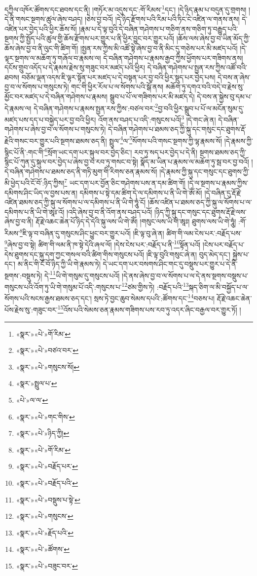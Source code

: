 དཀྱིལ་འཁོར་ཚོགས་དང་ཐབས་དང་ནི། །གཏོར་མ་འདུས་དང་:གོ་རིམས་\footnote{«སྣར་»«པེ་»གོ་རིམ་}དང་། །དེ་ཉིད་རྣམ་པ་བདུན་དུ་གྲགས། །དེ་ནི་གསང་སྔགས་ཚུལ་ཞེས་བཤད། །ཅེས་བྱ་བའོ། །དེ་ཉིད་རྫོགས་པའི་རིམ་པའི་ཏིང་ངེ་འཛིན་ལ་གནས་ནས། དེ་འཛིན་པར་བྱེད་པའི་ཕྱིར་ཆོས་སོ། །རྣམ་པ་དེ་ལྟ་བུའི་དེ་བཞིན་གཤེགས་པ་གཅིག་ནས་གཅིག་ཏུ་བརྒྱུད་པའི་སྔགས་ཀྱི་སྤྱོད་པའི་ཚུལ་གྱི་ཆོས་རྫོགས་པར་གྱུར་པ་ནི་ཕྱིར་བྱུང་བར་གྱུར་པའོ། །ཆོས་ལས་ཞེས་བྱ་བ་ཡིན་མོད་ཀྱི་ཆོས་ཞེས་བྱ་བ་ནི་ལུང་གི་ཚིག་གོ། །སྤྱན་རས་ཀྱིས་མི་འཚོ་སྟེ་ཞེས་བྱ་བ་ནི་མིང་དུ་གཅེས་པར་མི་མཛད་པའོ། །དེ་ལྟར་སྔགས་ལ་མཆོག་ཏུ་གཞོལ་བ་རྣམས་ལ། དེ་བཞིན་གཤེགས་པ་རྣམས་རྒྱབ་ཀྱིས་ཕྱོགས་པར་གཟིགས་ནས། དངོས་གྲུབ་འདོད་པ་དེ་རྣམས་རྗེས་སུ་གཟུང་བར་མཛད་པའི་ཕྱིར། དེ་བཞིན་གཤེགས་པ་སྤྱན་རས་ཀྱིས་འཚོ་བའི་ཐབས། བཅོམ་ལྡན་འདས་ཇི་ལྟར་སྟོན་པར་མཛད་པ་དེ་བསྟན་པར་བྱ་བའི་ཕྱིར་སྡུད་པར་བྱེད་པས། དེ་བས་ན་ཞེས་བྱ་བ་ལ་སོགས་པ་གསུངས་ཏེ། གང་གི་ཕྱིར་རོལ་པ་ལ་སོགས་པའི་སྒོ་ནས། མཆོག་ཏུ་དགའ་བའི་བདེ་བ་རྗེས་སུ་མྱོང་བར་མཛད་པ་དེ་བཞིན་གཤེགས་པ་རྣམས། སྒྲུབ་པ་པོ་ལ་གཟིགས་པར་མི་མཛད་དེ། དེ་བས་ན་སྐྱེས་བུ་དམ་པ་དེ་རྣམས་ལ། དེ་བཞིན་གཤེགས་པ་རྣམས་སྤྱན་རས་ཀྱིས་:བཙལ་བར་\footnote{«སྣར་»«པེ་»བཙའ་བར་}བྱ་བའི་ཕྱིར་སྒྲུབ་པ་པོ་ལ་མངོན་སུམ་དུ་མཛད་པས་དད་པ་བསྐྱེད་པར་བྱ་བའི་ཕྱིར། འོག་ནས་བཤད་པ་འདི་:གསུངས་པའོ།\footnote{«སྣར་»«པེ་»གསུངས་སོ།} །དེ་གང་ཞེ་ན། དེ་བཞིན་གཤེགས་པ་ཞེས་བྱ་བ་ལ་སོགས་པ་གསུངས་ཏེ། དེ་བཞིན་གཤེགས་པ་ཐམས་ཅད་ཀྱི་སྐུ་དང་གསུང་དང་ཐུགས་རྡོ་རྗེའི་གསང་བར་གྱུར་པའི་སྔགས་ཐམས་ཅད་ནི། སྤྲུལ་\footnote{«སྣར་»སྤྲུལ་པ་}ལ་\footnote{«པེ་»ལ་ལ་}སོགས་པའི་གསང་སྔགས་ཀྱི་ལྷ་རྣམས་སོ། །དེ་རྣམས་ཀྱི་སྙིང་པོ་ནི་:གང་གི་\footnote{«སྣར་»«པེ་»གང་གིས་}སྲོག་ཡང་དག་པར་སྐུལ་བར་བྱེད་ཅིང་། རབ་ཏུ་སད་པར་བྱེད་པ་དེ་ནི། སྔགས་ཐམས་ཅད་ཀྱི་སྙིང་པོ་ཀུན་དུ་སྐུལ་བར་བྱེད་པ་ཞེས་བྱ་བ་རབ་ཏུ་གསང་བ་སྟེ། སྣོད་མ་ཡིན་པ་རྣམས་ལ་མཆོག་ཏུ་སྦ་བར་བྱ་བའོ། །དེ་བཞིན་གཤེགས་པ་ཐམས་ཅད་ནི་གཏི་མུག་གི་རིགས་ཅན་རྣམས་སོ། །དེ་རྣམས་ཀྱི་སྐུ་དང་གསུང་དང་ཐུགས་ཀྱི་མི་ཕྱེད་པའི་ངོ་བོ་:ཉིད་ཀྱིས།\footnote{«སྣར་»«པེ་»ཉིད་ཀྱི།} ཡང་དག་པར་བྱོན་ཅིང་གཤེགས་པས་ན་དམ་ཚིག་གོ། །དེ་ལ་སྔགས་པ་རྣམས་ཀྱིས་དམིགས་ཤིང་ཡིད་ལ་བྱས་པས་ན། དམིགས་པ་སྟེ་དམ་ཚིག་དེ་ལ་དམིགས་པ་ནི་ཡི་གེ་ཨོཾ་མོ། །དེ་བཞིན་དུ་རྡོ་རྗེ་འཛིན་ཐམས་ཅད་ཀྱི་སྐུ་ལ་སོགས་པ་ལ་དམིགས་པ་ནི་ཡི་གེ་ཧཱུཾ་ངོ། །ཆོས་འཛིན་པ་ཐམས་ཅད་ཀྱི་སྐུ་ལ་སོགས་པ་ལ་དམིགས་པ་ནི་ཡི་གེ་ཨཱཿ་འོ། །འདི་ཞེས་བྱ་བ་ནི་འོག་ནས་བཤད་པའོ། །ཉིད་ཀྱི་སྐུ་དང་གསུང་དང་ཐུགས་རྡོ་རྗེ་ལས་ཞེས་བྱ་བ་ནི། རྡོ་རྗེ་འཆང་ཆེན་པོ་ཉིད་དེ་དེའི་སྐུ་ལས་ཡི་གེ་ཨོཾ། །གསུང་ལས་ཡི་གེ་ཨཱཿ། ཐུགས་ལས་ཡི་གེ་ཧཱུཾ། :གོ་རིམས་\footnote{«སྣར་»«པེ་»གོ་རིམ་}ཇི་ལྟ་བ་བཞིན་དུ་གསུངས་ཤིང་ཕྱུང་བར་གྱུར་པའོ། །ཇི་ལྟ་བུ་ཞེ་ན། ཚིག་གི་ལམ་ངེས་པར་:བརྗོད་པས་\footnote{«སྣར་»«པེ་»བརྗོད་པར་}ཞེས་བྱ་བ་སྟེ། ཚིག་གི་ལམ་ནི་ཁ་སྟེ་དེའི་ཞལ་ལོ། །དེས་ངེས་པར་:བརྗོད་པ་ནི་\footnote{«སྣར་»«པེ་»བརྗོད་པའི་}སྟོན་པའོ། །ངེས་པར་བརྗོད་པ་དེས་ཐུགས་དང་སྐུ་དག་ཀྱང་གསལ་བའི་ཚིག་གིས་གསུངས་པའོ། །ཇི་ལྟ་བུའི་གསུང་ཞེ་ན། བུད་མེད་དང་། སྐྱེས་པ་དང་། མ་ནིང་གི་ངོ་བོ་ཉིད་ཀྱི་ཡི་གེ་རྣམས་ཏེ། དེ་ཡང་དག་པར་བསགས་ཤིང་གང་དུ་བསྡུས་པར་གྱུར་པ་དེ་ནི་སྔགས་:བསྡུས་ཏེ། དེ་\footnote{«སྣར་»«པེ་»བསྡུས་པ་སྟེ་}ཡི་གེ་གསུམ་དུ་གསུངས་པའོ། །དེ་ནས་ཞེས་བྱ་བ་ལ་སོགས་པ་ལ་དེ་ནས་སྔགས་བསྡུས་པ་གསུངས་པའི་འོག་ཏུ་ཡི་གེ་གསུམ་པོ་འདི་:གསུངས་པ་\footnote{«སྣར་»«པེ་»གསུངས་}ཙམ་གྱིས་ཏེ། :བརྗོད་པའི་\footnote{«སྣར་»«པེ་»རྗོད་པའི་}སྐད་ཅིག་ལ་མི་བསྐྱོད་པ་ལ་སོགས་པའི་སངས་རྒྱས་ཐམས་ཅད་དང་། སྲས་ཏེ་བྱང་ཆུབ་སེམས་དཔའི་:ཚོགས་དང་\footnote{«སྣར་»«པེ་»ཚོགས་}བཅས་པ། རྡོ་རྗེ་འཆང་ཆེན་པོས་རྗེས་སུ་:གཟུང་བར་\footnote{«སྣར་»«པེ་»བཟུང་བར་}འོས་པའི་སེམས་ཅན་རྣམས་གཟིགས་པས་རབ་ཏུ་འདར་ཞིང་བརྒྱལ་བར་གྱུར་ཏོ། །
